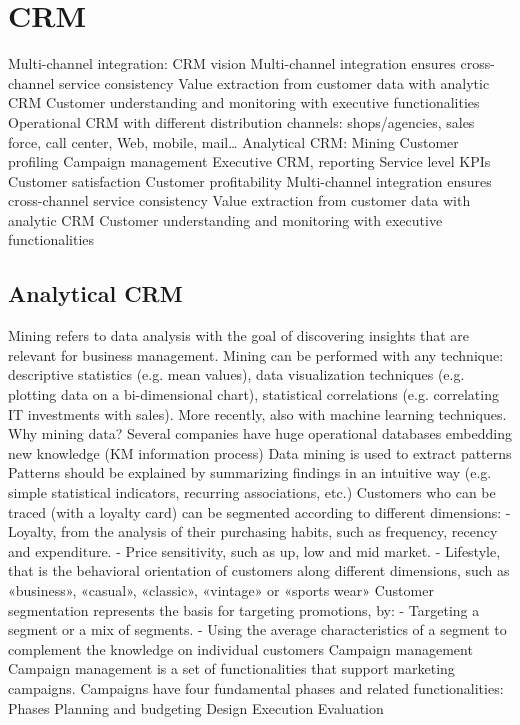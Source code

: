 \section{CRM}

Multi-channel integration: CRM vision
Multi-channel integration ensures cross-channel service consistency
Value extraction from customer data with analytic CRM
Customer understanding and monitoring with executive functionalities
Operational CRM with different distribution channels: shops/agencies, sales force, call center, Web,
mobile, mail…
Analytical CRM:
Mining
Customer profiling
Campaign management
Executive CRM, reporting
Service level KPIs
Customer satisfaction
Customer profitability
Multi-channel integration ensures cross-channel service consistency
Value extraction from customer data with analytic CRM
Customer understanding and monitoring with executive functionalities

\subsection{Analytical CRM}
Mining refers to data analysis with the goal of discovering insights that are relevant
for business management.
Mining can be performed with any technique: descriptive statistics (e.g. mean
values), data visualization techniques (e.g. plotting data on a bi-dimensional chart),
statistical correlations (e.g. correlating IT investments with sales). More recently,
also with machine learning techniques.
Why mining data?
Several companies have huge operational databases embedding new knowledge (KM
information process)
Data mining is used to extract patterns
Patterns should be explained by summarizing findings in an intuitive way (e.g. simple statistical
indicators, recurring associations, etc.)
Customers who can be traced (with a loyalty card) can be segmented according
to different dimensions:
- Loyalty, from the analysis of their purchasing habits, such as frequency,
recency and expenditure.
- Price sensitivity, such as up, low and mid market.
- Lifestyle, that is the behavioral orientation of customers along different
dimensions, such as «business», «casual», «classic», «vintage» or «sports
wear»
Customer segmentation represents the basis for targeting promotions, by:
- Targeting a segment or a mix of segments.
- Using the average characteristics of a segment to complement the
knowledge on individual customers
Campaign management
Campaign management is a set of functionalities that support marketing
campaigns. Campaigns have four fundamental phases and related functionalities:
Phases Planning and 
budgeting Design Execution Evaluation 


